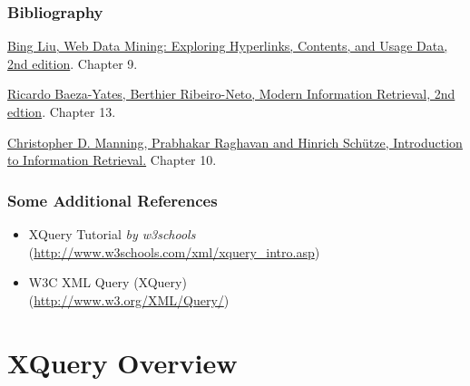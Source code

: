 \documentclass[svgnames]{beamer}
\subtitle{Semi-Structured Data : XQuery}
\begin{document}
\maketitle

\begin{frame} \frametitle{Bibliography}

   \begin{block}{}
        \href{http://www.cs.uic.edu/~liub/WebMiningBook.html}{Bing Liu, Web Data Mining: Exploring Hyperlinks, Contents, and
         Usage Data, 2nd edition}. Chapter 9.
    \end{block}

   \begin{block}{}

    \href{http://www.mir2ed.org/}{Ricardo Baeza-Yates,
            Berthier Ribeiro-Neto, Modern Information Retrieval, 2nd
            edtion}. Chapter 13.

    \end{block}

   \begin{block}{}

    \href{http://nlp.stanford.edu/IR-book/}{Christopher D. Manning, Prabhakar Raghavan and Hinrich Schütze, Introduction to Information Retrieval.} Chapter 10.

    \end{block}
    
\end{frame}

\begin{frame}
\frametitle{Some Additional References}

\begin{itemize}
 \item XQuery Tutorial {\it by w3schools} \\ {\scriptsize (\url{http://www.w3schools.com/xml/xquery_intro.asp})} \\
 
 \item W3C XML Query (XQuery) \\ {\scriptsize (\url{http://www.w3.org/XML/Query/})} 
\end{itemize}

\end{frame}

\section{XQuery Overview}
\end{document}
